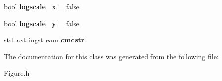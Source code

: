 \begin{DoxyCompactItemize}
\item 
\hypertarget{classkeycpp_1_1_plots_aa994c8e9f09633b26410ed27ea70a1a1}{bool {\bfseries logscale\-\_\-x} = false}\label{classkeycpp_1_1_plots_aa994c8e9f09633b26410ed27ea70a1a1}

\item 
\hypertarget{classkeycpp_1_1_plots_a605e7e4681e977f5d1d2ff95d72946cb}{bool {\bfseries logscale\-\_\-y} = false}\label{classkeycpp_1_1_plots_a605e7e4681e977f5d1d2ff95d72946cb}

\item 
\hypertarget{classkeycpp_1_1_plots_a0ed0add050a618468cbf2cffe2529bad}{std\-::ostringstream {\bfseries cmdstr}}\label{classkeycpp_1_1_plots_a0ed0add050a618468cbf2cffe2529bad}

\end{DoxyCompactItemize}


The documentation for this class was generated from the following file\-:\begin{DoxyCompactItemize}
\item 
Figure.\-h\end{DoxyCompactItemize}
